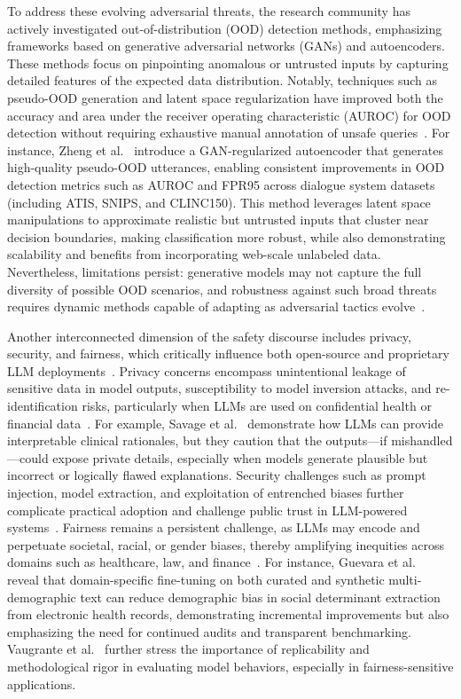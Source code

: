 \documentclass[sigconf]{acmart}
\begin{document}
To address these evolving adversarial threats, the research community has actively investigated out-of-distribution (OOD) detection methods, emphasizing frameworks based on generative adversarial networks (GANs) and autoencoders. These methods focus on pinpointing anomalous or untrusted inputs by capturing detailed features of the expected data distribution. Notably, techniques such as pseudo-OOD generation and latent space regularization have improved both the accuracy and area under the receiver operating characteristic (AUROC) for OOD detection without requiring exhaustive manual annotation of unsafe queries~\cite{ref78,ref82}. For instance, Zheng et al.~\cite{ref78} introduce a GAN-regularized autoencoder that generates high-quality pseudo-OOD utterances, enabling consistent improvements in OOD detection metrics such as AUROC and FPR95 across dialogue system datasets (including ATIS, SNIPS, and CLINC150). This method leverages latent space manipulations to approximate realistic but untrusted inputs that cluster near decision boundaries, making classification more robust, while also demonstrating scalability and benefits from incorporating web-scale unlabeled data. Nevertheless, limitations persist: generative models may not capture the full diversity of possible OOD scenarios, and robustness against such broad threats requires dynamic methods capable of adapting as adversarial tactics evolve~\cite{ref78}.

Another interconnected dimension of the safety discourse includes privacy, security, and fairness, which critically influence both open-source and proprietary LLM deployments~\cite{ref1,ref2,ref10,ref22,ref43,ref44,ref49,ref52,ref53,ref65}. Privacy concerns encompass unintentional leakage of sensitive data in model outputs, susceptibility to model inversion attacks, and re-identification risks, particularly when LLMs are used on confidential health or financial data~\cite{ref1,ref10,ref44}. For example, Savage et al.~\cite{ref1} demonstrate how LLMs can provide interpretable clinical rationales, but they caution that the outputs—if mishandled—could expose private details, especially when models generate plausible but incorrect or logically flawed explanations. Security challenges such as prompt injection, model extraction, and exploitation of entrenched biases further complicate practical adoption and challenge public trust in LLM-powered systems~\cite{ref49,ref52,ref53}. Fairness remains a persistent challenge, as LLMs may encode and perpetuate societal, racial, or gender biases, thereby amplifying inequities across domains such as healthcare, law, and finance~\cite{ref2,ref22,ref43,ref65}. For instance, Guevara et al.~\cite{ref2} reveal that domain-specific fine-tuning on both curated and synthetic multi-demographic text can reduce demographic bias in social determinant extraction from electronic health records, demonstrating incremental improvements but also emphasizing the need for continued audits and transparent benchmarking. Vaugrante et al.~\cite{ref22} further stress the importance of replicability and methodological rigor in evaluating model behaviors, especially in fairness-sensitive applications.
\end{document}
